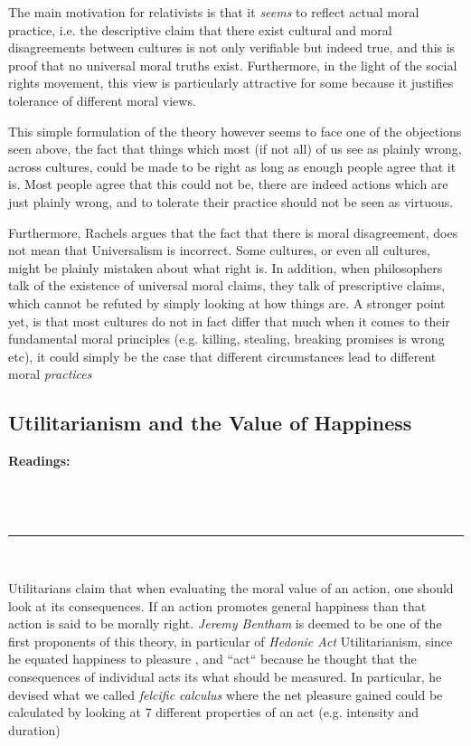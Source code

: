 \documentclass[english,course]{Notes}
\newcommand{\ita}[1]{\textit{#1}}
\newcommand\readings{\textbf{Readings:} \\}
\newcommand\sep{\\ \noindent\rule{10cm}{0.8pt} \\}
\begin{document}
{{\par{The main motivation for relativists is that it \ita{seems} to reflect actual moral practice, i.e. the descriptive claim that there exist cultural and moral disagreements between cultures is not only verifiable but indeed true, and this is proof that no universal moral truths exist. Furthermore, in the light of the social rights movement, this view is particularly attractive for some because it justifies tolerance of different moral views.}
\par{This simple formulation of the theory however seems to face one of the objections seen above, the fact that things which most (if not all) of us see as plainly wrong, across cultures, could be made to be right as long as enough people agree that it is. Most people agree that this could not be, there are indeed actions which are just plainly wrong, and to tolerate their practice should not be seen as virtuous.} 
\par{Furthermore, Rachels argues that the fact that there is moral disagreement, does not mean that Universalism is incorrect. Some cultures, or even all cultures, might be plainly mistaken about what right is. In addition, when philosophers talk of the existence of universal moral claims, they talk of prescriptive claims, which cannot be refuted by simply looking at how things are. A stronger point yet, is that most cultures do not in fact differ that much when it comes to their fundamental moral principles (e.g. killing, stealing, breaking promises is wrong etc), it could simply be the case that different circumstances lead to different moral \ita{practices}}




\newpage
\subsection{Utilitarianism and the Value of Happiness}
\readings \cite[Chapter 3]{driver_2014} \\ \cite[Chapter 12]{darwall_1998} \\ \cite{mccord}
\sep


\par{Utilitarians claim that when evaluating the moral value of an action, one should look at its consequences. If an action promotes general happiness than that action is said to be morally right. \ita{Jeremy Bentham} is deemed to be one of the first proponents of this theory, in particular of \ita{Hedonic Act} Utilitarianism, since he equated happiness to pleasure , and ``act`` because he thought that the consequences of individual acts its what should be measured. In particular, he devised what we called \ita{felcific calculus} where the net pleasure gained could be calculated by looking at 7 different properties of an act (e.g. intensity and duration)}

}}
\end{document}
